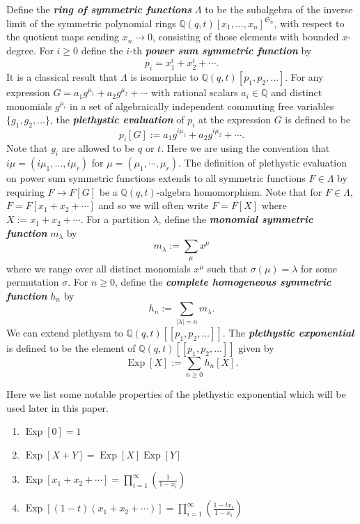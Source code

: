 \documentclass[ALCO,Unicode]{cedram}
\DeclareMathOperator{\EXP}{\mathrm{Exp}}
\begin{document}
 \begin{defi}\label{sym functions defn}
 Define the \textbf{\textit{ring of symmetric functions}} $\Lambda$ to be the subalgebra of the inverse limit of the symmetric polynomial rings $\mathbb{Q}(q,t)[x_1,\ldots,x_n]^{\mathfrak{S}_n}$, with respect to the quotient maps sending $x_n \rightarrow 0$, consisting of those elements with bounded $x$-degree. For $i \geq 0$ define the $i$-th \textbf{\textit{power sum symmetric function}} by
 $$p_i = x_1^i + x_2^i + \cdots .$$ It is a classical result that $\Lambda$ is isomorphic to $\mathbb{Q}(q,t)[p_1,p_2,\ldots]$. For any expression $G = a_1g^{\mu_1} + a_2g^{\mu_2} +\cdots$ with rational scalars $a_i \in \mathbb{Q}$ and distinct monomials $g^{\mu_i}$ in a set of algebraically independent commuting free variables $\{g_1,g_2,\ldots\}$, the \textbf{\textit{plethystic evaluation}} of $p_i$ at the expression $G$ is defined to be $$p_i[G] := a_1g^{i\mu_1} +a_2g^{i \mu_2}+ \cdots .$$ Note that $g_i$ are allowed to be $q$ or $t.$ Here we are using the convention that $i\mu = (i\mu_1,\ldots, i \mu_r)$ for $\mu = (\mu_1,\cdots, \mu_r).$ The definition of plethystic evaluation on power sum symmetric functions extends to all symmetric functions $F \in \Lambda$ by requiring $F \rightarrow F[G]$ be a $\mathbb{Q}(q,t)$-algebra homomorphism. Note that for $F \in \Lambda$, $F = F[x_1+x_2+ \cdots]$ and so we will often write $F = F[X]$ where $X:= x_1+ x_2 + \cdots.$ For a partition $\lambda$, define the \textbf{\textit{monomial symmetric function}} $m_\lambda$ by 
 $$m_\lambda := \sum_{\mu} x^{\mu}$$
 where we range over all distinct monomials $x^{\mu}$ such that $\sigma(\mu) = \lambda$ for some permutation $\sigma$. For $n \geq 0$, define the \textbf{\textit{complete homogeneous symmetric function}} $h_n$ by 
 $$h_n:= \sum_{|\lambda|= n} m_\lambda .$$ We can extend plethysm to $\mathbb{Q}(q,t)[[p_1,p_2,\ldots]]$.  The \textbf{\textit{plethystic exponential}} is defined to be the element of $\mathbb{Q}(q,t)[[p_1,p_2,\ldots]]$ given by 
 $$\EXP[X]:= \sum_{n \geq 0} h_n[X].$$ 
 \end{defi}


Here we list some notable properties of the plethystic exponential which will be used later in this paper.

\begin{enumerate}
    \item $\EXP[0] = 1$
    \item $\EXP[X+Y]= \EXP[X]\EXP[Y]$
    \item $\EXP[x_1+x_2+\cdots] = \prod_{i=1}^{\infty} \left( \frac{1}{1-x_i} \right)$
    \item $\EXP[(1-t)(x_1+x_2+\cdots)] = \prod_{i=1}^{\infty} \left( \frac{1-tx_i}{1-x_i} \right)$
\end{enumerate}
\end{document}
